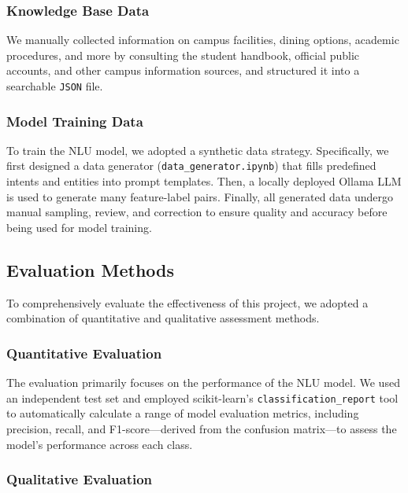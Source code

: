 \documentclass{xum_review}
\begin{document}
	\subsubsection{Knowledge Base Data}
	We manually collected information on campus facilities, dining options, academic procedures, and more by consulting
	the student handbook, official public accounts, and other campus information sources, and structured it into a
	searchable \texttt{JSON} file.

	\subsubsection{Model Training Data}
	
	To train the NLU model, we adopted a synthetic data strategy. Specifically, we first designed a data generator
	(\texttt{data\_generator.ipynb}) that fills predefined intents and entities into prompt templates. Then, a locally deployed
	Ollama LLM is used to generate many feature-label pairs. Finally, all generated data undergo manual sampling,
	review, and correction to ensure quality and accuracy before being used for model training\citep{li2024datagenerationusinglarge}.

	\subsection{Evaluation Methods}

	To comprehensively evaluate the effectiveness of this project, we adopted a combination of quantitative and
	qualitative assessment methods\citep{0b014ee667a84c5985984bfd771595a3}.

	\subsubsection{Quantitative Evaluation}
	
	The evaluation primarily focuses on the performance of the NLU model. We used an independent test set and employed
	scikit-learn's \texttt{classification\_report} tool to automatically calculate a range of model evaluation metrics,
	including precision, recall, and F1-score—derived from the confusion matrix—to assess the model's performance across
	each class.

	\subsubsection{Qualitative Evaluation}
\end{document}

